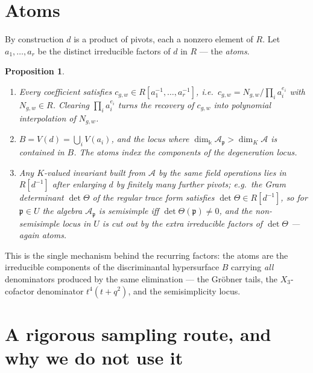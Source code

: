 \documentclass[11pt]{article}
\newtheorem{proposition}[theorem]{Proposition}
\theoremstyle{definition}
\newcommand{\kk}{\Bbbk}
\newcommand{\A}{\mathcal{A}}
\newcommand{\pp}{\mathfrak{p}}
\begin{document}
\section{Atoms}

By construction $d$ is a product of pivots, each a nonzero element of $R$. Let $a_1,\dots,a_r$ be
the distinct irreducible factors of $d$ in $R$ --- the \emph{atoms}.

\begin{proposition}\label{prop:atoms}
\leavevmode
\begin{enumerate}
\item[\textup{(i)}] Every coefficient satisfies $c_{g,w}\in R[a_1^{-1},\dots,a_r^{-1}]$, i.e.\
$c_{g,w}=N_{g,w}/\prod_i a_i^{e_i}$ with $N_{g,w}\in R$. Clearing $\prod_i a_i^{e_i}$ turns the
recovery of $c_{g,w}$ into polynomial interpolation of $N_{g,w}$.
\item[\textup{(ii)}] $B=V(d)=\bigcup_i V(a_i)$, and the locus where $\dim_\kk\A_\pp>\dim_K\A$ is
contained in $B$. The atoms index the components of the degeneration locus.
\item[\textup{(iii)}] Any $K$-valued invariant built from $\A$ by the same field operations lies in
$R[d^{-1}]$ after enlarging $d$ by finitely many further pivots; e.g.\ the Gram determinant
$\det\Theta$ of the regular trace form satisfies $\det\Theta\in R[d^{-1}]$, so for $\pp\in U$ the
algebra $\A_\pp$ is semisimple iff $\det\Theta(\pp)\neq0$, and the non-semisimple locus in $U$ is
cut out by the extra irreducible factors of $\det\Theta$ --- again atoms.
\end{enumerate}
\end{proposition}

This is the single mechanism behind the recurring factors: the atoms are the irreducible components
of the discriminantal hypersurface $B$ carrying \emph{all} denominators produced by the same
elimination --- the Gr\"obner tails, the $X_3$-cofactor denominator $t^4(t+q^2)$, and the
semisimplicity locus.

\section{A rigorous sampling route, and why we do not use it}
\end{document}
